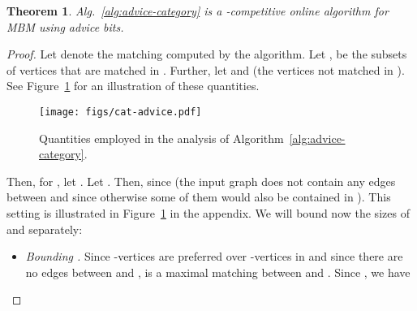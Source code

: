 \documentclass[a4paper]{article}
\newtheorem{theorem}{Theorem}
\begin{document}
\begin{theorem} \label{thm:adv-cat}
 Alg.~\ref{alg:advice-category} is a -competitive online algorithm
 for \textsc{MBM} using  advice bits.
\end{theorem}
\begin{proof}
 Let  denote the matching computed by the algorithm.
 Let ,  be the subsets of vertices that are matched in .
 Further, let  and  (the vertices not matched in ).
See Figure~\ref{fig:adv-cat} for an illustration of these quantities.

\begin{figure}[H]
{\small
\begin{center}
\texttt{[image: figs/cat-advice.pdf]}

 \hspace{1.9cm} 

\vspace{-2.3cm}

 \hspace{1.5cm}  \hspace{1.2cm}  \hspace{1.5cm} 

\vspace{0.6cm}

 \hspace{1.5cm}  \hspace{1.2cm}  \hspace{1.5cm} 

\vspace{-1.6cm}
 \hspace{3.2cm} 

\vspace{0.25cm}
  \hspace{3.3cm} 

\vspace{0.59cm}
  \hspace{3.3cm} 

\end{center}
}
\caption{Quantities employed in the analysis of Algorithm~\ref{alg:advice-category}.}
\label{fig:adv-cat}
\end{figure}


 Then, for , let . Let
 .
 Then,  since  (the input graph does
 not contain any edges between  and  since otherwise some of them would also be contained in ).
 This setting is illustrated in Figure~\ref{fig:adv-cat} in the appendix. We will bound now the sizes of  and  separately:
 \begin{itemize}
  \item \textit{Bounding .} Since -vertices are preferred over -vertices in
   and since there are no edges between  and ,  is a maximal matching between
  and . Since , we have 



\end{itemize}
\end{proof}
\end{document}
